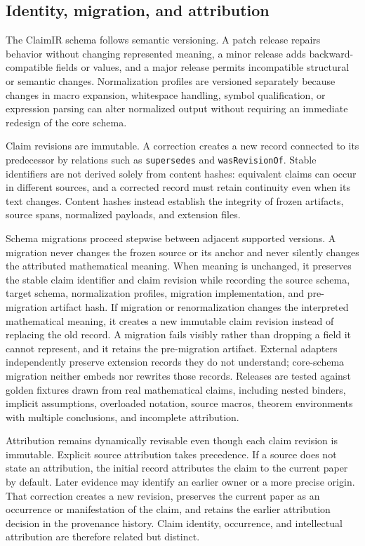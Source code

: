 \subsection{Identity, migration, and attribution}

The ClaimIR schema follows semantic versioning. A patch release repairs behavior without changing represented meaning, a minor release adds backward-compatible fields or values, and a major release permits incompatible structural or semantic changes. Normalization profiles are versioned separately because changes in macro expansion, whitespace handling, symbol qualification, or expression parsing can alter normalized output without requiring an immediate redesign of the core schema.

Claim revisions are immutable. A correction creates a new record connected to its predecessor by relations such as \texttt{supersedes} and \texttt{wasRevisionOf}. Stable identifiers are not derived solely from content hashes: equivalent claims can occur in different sources, and a corrected record must retain continuity even when its text changes. Content hashes instead establish the integrity of frozen artifacts, source spans, normalized payloads, and extension files.

Schema migrations proceed stepwise between adjacent supported versions. A migration never changes the frozen source or its anchor and never silently changes the attributed mathematical meaning. When meaning is unchanged, it preserves the stable claim identifier and claim revision while recording the source schema, target schema, normalization profiles, migration implementation, and pre-migration artifact hash. If migration or renormalization changes the interpreted mathematical meaning, it creates a new immutable claim revision instead of replacing the old record. A migration fails visibly rather than dropping a field it cannot represent, and it retains the pre-migration artifact. External adapters independently preserve extension records they do not understand; core-schema migration neither embeds nor rewrites those records. Releases are tested against golden fixtures drawn from real mathematical claims, including nested binders, implicit assumptions, overloaded notation, source macros, theorem environments with multiple conclusions, and incomplete attribution.

Attribution remains dynamically revisable even though each claim revision is immutable. Explicit source attribution takes precedence. If a source does not state an attribution, the initial record attributes the claim to the current paper by default. Later evidence may identify an earlier owner or a more precise origin. That correction creates a new revision, preserves the current paper as an occurrence or manifestation of the claim, and retains the earlier attribution decision in the provenance history. Claim identity, occurrence, and intellectual attribution are therefore related but distinct.

